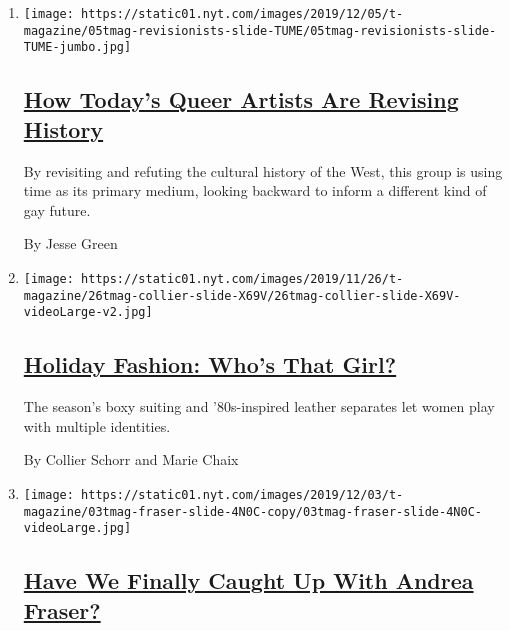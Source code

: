 \begin{enumerate}
\def\labelenumi{\arabic{enumi}.}
\item
  \texttt{[image: https://static01.nyt.com/images/2019/12/05/t-magazine/05tmag-revisionists-slide-TUME/05tmag-revisionists-slide-TUME-jumbo.jpg]}

  \hypertarget{how-todays-queer-artists-are-revising-history}{%
  \subsection{\texorpdfstring{\href{/2019/12/04/t-magazine/gay-artwork-history.html}{How
  Today's Queer Artists Are Revising
  History}}{How Today's Queer Artists Are Revising History}}\label{how-todays-queer-artists-are-revising-history}}

  By revisiting and refuting the cultural history of the West, this
  group is using time as its primary medium, looking backward to inform
  a different kind of gay future.

  By Jesse Green
\item
  \texttt{[image: https://static01.nyt.com/images/2019/11/26/t-magazine/26tmag-collier-slide-X69V/26tmag-collier-slide-X69V-videoLarge-v2.jpg]}

  \hypertarget{holiday-fashion-whos-that-girl}{%
  \subsection{\texorpdfstring{\href{/2019/11/26/t-magazine/holiday-fashion.html}{Holiday
  Fashion: Who's That
  Girl?}}{Holiday Fashion: Who's That Girl?}}\label{holiday-fashion-whos-that-girl}}

  The season's boxy suiting and '80s-inspired leather separates let
  women play with multiple identities.

  By Collier Schorr and Marie Chaix
\item
  \texttt{[image: https://static01.nyt.com/images/2019/12/03/t-magazine/03tmag-fraser-slide-4N0C-copy/03tmag-fraser-slide-4N0C-videoLarge.jpg]}

  \hypertarget{have-we-finally-caught-up-with-andrea-fraser}{%
  \subsection{\texorpdfstring{\href{/2019/12/03/t-magazine/andrea-fraser.html}{Have
  We Finally Caught Up With Andrea
  Fraser?}}{Have We Finally Caught Up With Andrea Fraser?}}\label{have-we-finally-caught-up-with-andrea-fraser}}


\end{enumerate}
